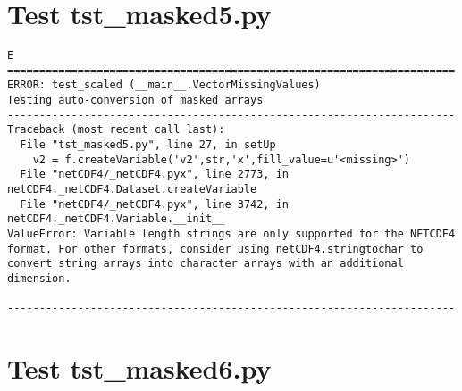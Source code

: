 \section{Test tst\_masked5.py}

\begin{verbatim}
E
======================================================================
ERROR: test_scaled (__main__.VectorMissingValues)
Testing auto-conversion of masked arrays
----------------------------------------------------------------------
Traceback (most recent call last):
  File "tst_masked5.py", line 27, in setUp
    v2 = f.createVariable('v2',str,'x',fill_value=u'<missing>')
  File "netCDF4/_netCDF4.pyx", line 2773, in netCDF4._netCDF4.Dataset.createVariable
  File "netCDF4/_netCDF4.pyx", line 3742, in netCDF4._netCDF4.Variable.__init__
ValueError: Variable length strings are only supported for the NETCDF4 format. For other formats, consider using netCDF4.stringtochar to convert string arrays into character arrays with an additional dimension.

----------------------------------------------------------------------
\end{verbatim}

\section{Test tst\_masked6.py}

